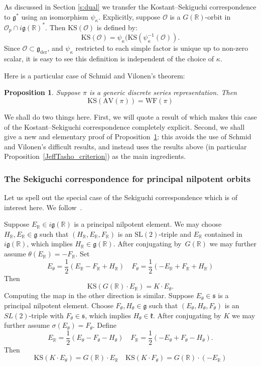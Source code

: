 \documentclass[10pt,leqno]{article}
\newtheorem{proposition}[equation]{Proposition}
\numberwithin{equation}{section}
\renewcommand{\O}{\mathcal O}
\newcommand{\R}{\mathbb R}
\renewcommand{\k}{\mathfrak k}
\newcommand{\g}{\mathfrak g}
\newcommand{\gder}{\mathfrak g_{\mathrm{der}}}
\newcommand\inv{^{-1}}
\newcommand{\s}{\mathfrak s}
\newcommand{\AV}{\mathrm{AV}}
\newcommand{\KS}{\mathrm{KS}}
\newcommand{\WF}{\mathrm{WF}}
\begin{document}
As discussed in Section \ref{s:dual} we transfer the Kostant--Sekiguchi correspondence to $\g^*$ using  an isomorphism $\psi_\kappa$.
Explicitly, suppose $\O$ is a $G(\R)$-orbit in $\O_p\cap i\g(\R)^*$.  Then $\KS(\O)$ is defined by:
$$
\KS(\O)=\psi_\kappa(\KS(\psi_\kappa\inv(\O)).
$$
Since $\O\subset \gder$, and $\psi_\kappa$ restricted to each simple factor is unique up to non-zero scalar, it is easy to see this definition
is independent of the choice of $\kappa$. 

Here is a particular case of Schmid and Vilonen's theorem:

\begin{proposition} \label{Sekiguchi_result}
Suppose $\pi$ is a generic discrete series representation. Then
$$
\KS(\AV(\pi))=\WF(\pi)
$$
\end{proposition}

We shall do two things here. First, we will quote a result of \cite{AVAV} which makes this case of the Kostant--Sekiguchi correspondence completely explicit. Second, we shall give a new and elementary proof of Proposition~\ref{Sekiguchi_result}: this avoids the use of Schmid and Vilonen's difficult results, and instead uses the results above (in particular Proposition~\ref{JeffTasho_criterion}) as the main ingredients. 


\subsubsection{The Sekiguchi correspondence for principal nilpotent orbits}\label{sec:concrete_sek}
Let us spell out the special case of the Sekiguchi correspondence which is of interest here. We follow~\cite[Section~2]{AVAV}.


Suppose $E_\R\in i\g(\R)$ is a principal nilpotent element.
We may choose $H_\R, E_\R \in \g$ such that $(H_\R,E_\R,F_\R)$ is an $\mathrm{SL}(2)$-triple and  $E_\R$  contained in $i\g(\R)$,
which implies $H_\R\in \g(\R)$. 
After conjugating by~$G(\R)$ we may further assume $\theta(E_\R)=-F_\R$. Set 
\[   E_\theta=\frac12(E_\R-F_\R+H_\R)\quad
F_\theta=\frac12(-E_\R+F_\R+H_\R)
\]
Then
$$
\KS(G(\R)\cdot E_\R)=K\cdot E_\theta.
$$
Computing the map in the other direction is similar. Suppose $E_\theta\in \s$ is a principal nilpotent element. 
Choose $F_\theta, H_\theta \in \g$ such that $(E_\theta, H_\theta, F_\theta)$ is an $SL(2)$-triple with $F_\theta \in \s$,  which implies $H_\theta\in\k$. After conjugating by $K$ we may further assume $\sigma(E_\theta)=F_\theta$.
Define 
\begin{equation}\label{def_F_R}
E_\R=\frac12(E_\theta-F_\theta-H_\theta)\quad
F_\R=\frac12(-E_\theta+F_\theta-H_\theta).
\end{equation}
Then
\begin{equation}
\label{e:KS}
\KS(K\cdot E_\theta)=G(\R)\cdot E_\R\quad\KS(K\cdot F_\theta)=G(\R)\cdot(-E_\R)
\end{equation}
\end{document}
